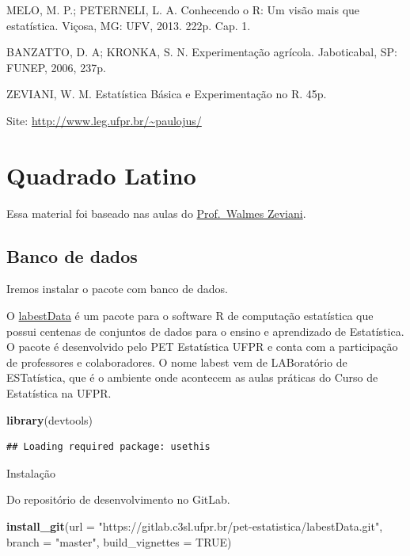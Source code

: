 \documentclass[
]{book}
\newenvironment{Shaded}{\begin{snugshade}}{\end{snugshade}}
\newcommand{\DataTypeTok}[1]{\textcolor[rgb]{0.13,0.29,0.53}{#1}}
\newcommand{\KeywordTok}[1]{\textcolor[rgb]{0.13,0.29,0.53}{\textbf{#1}}}
\newcommand{\NormalTok}[1]{#1}
\newcommand{\OtherTok}[1]{\textcolor[rgb]{0.56,0.35,0.01}{#1}}
\newcommand{\StringTok}[1]{\textcolor[rgb]{0.31,0.60,0.02}{#1}}
\begin{document}
MELO, M. P.; PETERNELI, L. A. Conhecendo o R: Um visão mais que estatística. Viçosa, MG: UFV, 2013. 222p. Cap. 1.

BANZATTO, D. A; KRONKA, S. N. Experimentação agrícola. Jaboticabal, SP: FUNEP, 2006, 237p.

ZEVIANI, W. M. Estatística Básica e Experimentação no R. 45p.

Site: \url{http://www.leg.ufpr.br/~paulojus/}

\hypertarget{quadrado-latino}{%
\section{Quadrado Latino}\label{quadrado-latino}}

Essa material foi baseado nas aulas do \href{https://www.youtube.com/user/walmes}{Prof.~Walmes Zeviani}.

\hypertarget{banco-de-dados}{%
\subsection{Banco de dados}\label{banco-de-dados}}

Iremos instalar o pacote com banco de dados.

O \href{https://gitlab.c3sl.ufpr.br/pet-estatistica/labestData\#descrio}{labestData} é um pacote para o software R de computação estatística que possui centenas de conjuntos de dados para o ensino e aprendizado de Estatística. O pacote é desenvolvido pelo PET Estatística UFPR e conta com a participação de professores e colaboradores. O nome
labest vem de LABoratório de ESTatística, que é o ambiente onde acontecem as aulas práticas do Curso de Estatística na UFPR.

\begin{Shaded}
\begin{Highlighting}[]
\KeywordTok{library}\NormalTok{(devtools)}
\end{Highlighting}
\end{Shaded}

\begin{verbatim}
## Loading required package: usethis
\end{verbatim}

Instalação

Do repositório de desenvolvimento no GitLab.

\begin{Shaded}
\begin{Highlighting}[]
\KeywordTok{install_git}\NormalTok{(}\DataTypeTok{url =} \StringTok{"https://gitlab.c3sl.ufpr.br/pet-estatistica/labestData.git"}\NormalTok{,}
            \DataTypeTok{branch =} \StringTok{"master"}\NormalTok{, }\DataTypeTok{build_vignettes =} \OtherTok{TRUE}\NormalTok{)}
\end{Highlighting}
\end{Shaded}
\end{document}
